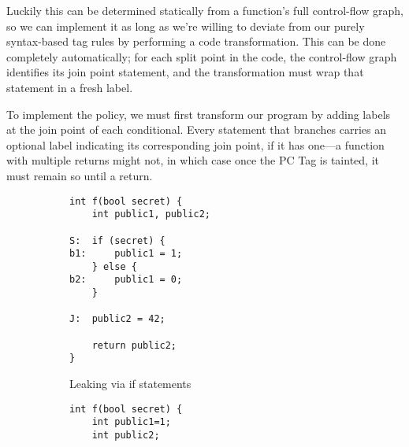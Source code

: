 \documentclass{llncs}
\begin{document}
Luckily this can be determined statically from a function's full control-flow graph,
so we can implement it as long as we're willing to deviate from our purely syntax-based
tag rules by performing a code transformation. This can be done completely automatically;
for each split point in the code, the control-flow graph identifies its join point statement,
and the transformation must wrap that statement in a fresh label.

To implement the policy, we must first transform our program
by adding labels at the join point of each conditional.
Every statement that branches carries an optional label indicating its corresponding
join point, if it has one---a function with multiple returns might not, in which case
once the PC Tag is tainted, it must remain so until a return.

\begin{figure}[t]
  \begin{subfigure}{0.49\textwidth}
\begin{verbatim}
int f(bool secret) {
    int public1, public2;

S:  if (secret) {
b1:     public1 = 1;
    } else {
b2:     public1 = 0;
    }

J:  public2 = 42;

    return public2;
}
\end{verbatim}
\caption{Leaking via if statements}
\label{fig:ifthenelse}
  \end{subfigure}
%
%  
%
  \begin{subfigure}{0.49\textwidth}
\begin{verbatim}
int f(bool secret) {
    int public1=1;
    int public2;


\end{verbatim}
\end{subfigure}
\end{figure}
\end{document}
